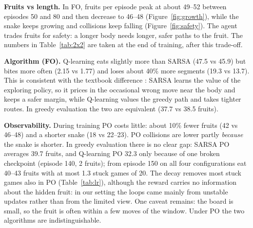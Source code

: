 \documentclass{article}
\begin{document}
\textbf{Fruits vs length.} In FO, fruits per episode peak at about 49--52 between episodes 50 and 80 and then decrease to 46--48 (Figure~\ref{fig:growth}), while the snake keeps growing and collisions keep falling (Figure~\ref{fig:safety}). The agent trades fruits for safety: a longer body needs longer, safer paths to the fruit. The numbers in Table~\ref{tab:2x2} are taken at the end of training, after this trade-off.

\textbf{Algorithm (FO).} Q-learning eats slightly more than SARSA (47.5 vs 45.9) but bites more often (2.15 vs 1.77) and loses about 40\% more segments (19.3 vs 13.7).
This is consistent with the textbook difference \cite{sutton2018}: SARSA learns the value of the exploring policy, so it prices in the occasional wrong move near the body and keeps a safer margin, while Q-learning values the greedy path and takes tighter routes.
In greedy evaluation the two are equivalent (37.7 vs 38.5 fruits).

\textbf{Observability.} During training PO costs little: about 10\% fewer fruits (42 vs 46--48) and a shorter snake (18 vs 22--23). PO collisions are lower partly \emph{because} the snake is shorter.
In greedy evaluation there is no clear gap: SARSA PO averages 39.7 fruits, and Q-learning PO 32.3 only because of one broken checkpoint (episode 140, 2 fruits); from episode 150 on all four configurations eat 40--43 fruits with at most 1.3 stuck games of 20.
The decay removes most stuck games also in PO (Table~\ref{tab:lr}), although the reward carries no information about the hidden fruit: in our setting the loops came mainly from unstable updates rather than from the limited view.
One caveat remains: the board is small, so the fruit is often within a few moves of the window.
Under PO the two algorithms are indistinguishable.
\end{document}
